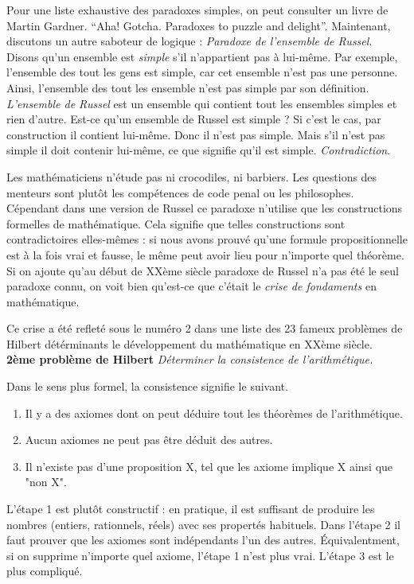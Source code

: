 \documentclass[12pt, a4paper]{article}
\newtheorem*{problem}{Problème}
\begin{document}
Pour une liste exhaustive des paradoxes simples, on peut consulter un livre de Martin Gardner. ``Aha! Gotcha. Paradoxes to puzzle and delight''.
Maintenant, discutons un autre saboteur de logique : \emph{Paradoxe de l'ensemble de Russel}.
Disons qu'un ensemble est \emph{simple} s'il n'appartient pas à lui-même. Par exemple, l'ensemble des tout les gens est simple, car cet ensemble n'est pas une personne. Ainsi, l'ensemble des tout les ensemble n'est pas simple par son définition. \emph{L'ensemble de Russel} est un ensemble qui contient tout les ensembles simples et rien d'autre.
Est-ce qu'un ensemble de Russel est simple ? Si c'est le cas, par construction il contient lui-même. Donc il n'est pas simple. Mais s'il n'est pas simple il doit contenir lui-même, ce que signifie qu'il est simple. \emph{Contradiction}.

Les mathématiciens n'étude pas ni crocodiles, ni barbiers.
Les questions des menteurs sont plutôt les compétences de code penal ou les philosophes.
Cépendant dans une version de Russel ce paradoxe n'utilise que les constructions formelles de mathématique. Cela signifie que telles constructions sont contradictoires elles-mêmes : si nous avons prouvé qu'une formule propositionnelle est à la fois vrai et fausse, le même peut avoir lieu pour n'importe quel théorème.
Si on ajoute qu'au début de XXème siècle paradoxe de Russel n'a pas été le seul paradoxe connu, on voit bien qu'est-ce que c'était le \emph{crise de fondaments} en mathématique.

Ce crise a été refleté sous le numéro 2 dans une liste des 23 fameux problèmes de Hilbert détérminants le développement du mathématique en XXème siècle. \\
\textbf{2ème problème de Hilbert}
\textit{Déterminer la consistence de l'arithmétique.}

Dans le sens plus formel, la consistence signifie le suivant.
\begin{enumerate}
	\item Il y a des axiomes dont on peut déduire tout les théorèmes de l'arithmétique.
	\item Aucun axiomes ne peut pas être déduit des autres.
	\item Il n'existe pas d'une proposition X, tel que les axiome implique X ainsi que "non X".
\end{enumerate}
L'étape 1 est plutôt constructif : en pratique, il est suffisant de produire les nombres (entiers, rationnels, réels) avec ses propertés habituels.
Dans l'étape 2 il faut prouver que les axiomes sont indépendants l'un des autres.
Équivalentment, si on supprime n'importe quel axiome, l'étape 1 n'est plus vrai.
L'étape 3 est le plus compliqué.
\end{document}
